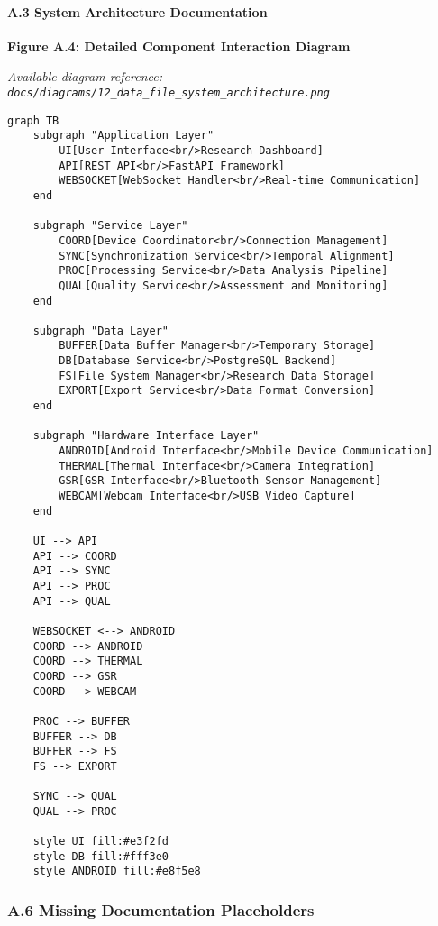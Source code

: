 \documentclass[11pt,a4paper]{article}
\begin{document}
\paragraph{A.3 System Architecture Documentation}

\textbf{Figure A.4: Detailed Component Interaction Diagram}

\textit{Available diagram reference: \texttt{docs/diagrams/12\_data\_file\_system\_architecture.png}}

\begin{verbatim}
graph TB
    subgraph "Application Layer"
        UI[User Interface<br/>Research Dashboard]
        API[REST API<br/>FastAPI Framework]
        WEBSOCKET[WebSocket Handler<br/>Real-time Communication]
    end

    subgraph "Service Layer"
        COORD[Device Coordinator<br/>Connection Management]
        SYNC[Synchronization Service<br/>Temporal Alignment]
        PROC[Processing Service<br/>Data Analysis Pipeline]
        QUAL[Quality Service<br/>Assessment and Monitoring]
    end

    subgraph "Data Layer"
        BUFFER[Data Buffer Manager<br/>Temporary Storage]
        DB[Database Service<br/>PostgreSQL Backend]
        FS[File System Manager<br/>Research Data Storage]
        EXPORT[Export Service<br/>Data Format Conversion]
    end

    subgraph "Hardware Interface Layer"
        ANDROID[Android Interface<br/>Mobile Device Communication]
        THERMAL[Thermal Interface<br/>Camera Integration]
        GSR[GSR Interface<br/>Bluetooth Sensor Management]
        WEBCAM[Webcam Interface<br/>USB Video Capture]
    end

    UI --> API
    API --> COORD
    API --> SYNC
    API --> PROC
    API --> QUAL

    WEBSOCKET <--> ANDROID
    COORD --> ANDROID
    COORD --> THERMAL
    COORD --> GSR
    COORD --> WEBCAM

    PROC --> BUFFER
    BUFFER --> DB
    BUFFER --> FS
    FS --> EXPORT

    SYNC --> QUAL
    QUAL --> PROC

    style UI fill:#e3f2fd
    style DB fill:#fff3e0
    style ANDROID fill:#e8f5e8
\end{verbatim}

\subsubsection{A.6 Missing Documentation Placeholders}
\end{document}
